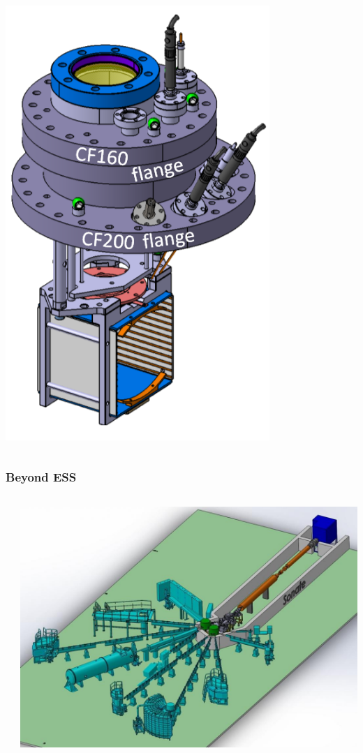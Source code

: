 \begin{frame}
\begin{columns}[T]
\begin{column}{0.45\textwidth}
      \includegraphics[width=0.75\textwidth]{05_Conclusion/fig/fig000_bride_double2_a}
    \end{column}
  \end{columns}
\end{frame}

\begin{frame}
  \frametitle{Beyond ESS}
  \begin{columns}[T]
    \begin{column}{0.45\textwidth}

    \end{column}
    \begin{column}{0.45\textwidth}
      \includegraphics[width=1\textwidth]{05_Conclusion/fig/fig000_SONATE}
    \end{column}
  \end{columns}
\end{frame}